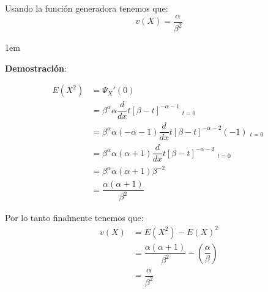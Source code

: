 \documentclass[12pt, fleqn]{report}                             %
\newenvironment{SmallIndentation}[1][0.75em]                    %
        {\begin{adjustwidth}{#1}{}\begin{footnotesize}}             %
        {\end{footnotesize}\end{adjustwidth}}                       %
\theoremstyle{break}                                            %
\newcommand{\Wrap}[1]{\left( #1 \right)}                        %
\newcommand \MiniDerivate[1][x] {\dfrac{d}{d #1}}               %
\DeclareMathOperator \Evaluate  {\Big|}                         %
\begin{document}
                Usando la función generadora tenemos que:
                \begin{equation*}
                    v(X) = \dfrac{\alpha}{\beta^2}
                \end{equation*}

                \begin{SmallIndentation}[1em]
                    \textbf{Demostración}:
                    
                    \begin{align*}
                        E(X^2)
                            &= \Psi_X'(0)               \\
                            &=  \beta^\alpha \alpha 
                                    \MiniDerivate{t} [\beta - t]^{-\alpha -1} \Evaluate_{t = 0}         \\
                            &= \beta^\alpha \alpha (-\alpha -1) 
                                    \MiniDerivate{t} [\beta - t]^{-\alpha -2}(-1) \Evaluate_{t = 0}     \\
                            &= \beta^\alpha \alpha (\alpha+1) 
                                    \MiniDerivate{t} [\beta - t]^{-\alpha -2} \Evaluate_{t = 0}         \\
                            &= \beta^\alpha \alpha (\alpha+1) 
                                    \beta^{-2}                                                          \\
                            &= \dfrac{\alpha(\alpha + 1)}{\beta^2}
                    \end{align*}

                    Por lo tanto finalmente tenemos que:
                    \begin{align*}
                        v(X)
                            &= E(X^2) - E(X)^2                                                                \\
                            &= \dfrac{\alpha(\alpha + 1)}{\beta^2} - \Wrap{\dfrac{\alpha}{\beta}}             \\
                            &= \dfrac{\alpha}{\beta^2}
                    \end{align*}
                
                \end{SmallIndentation}



            \clearpage
\end{document}
